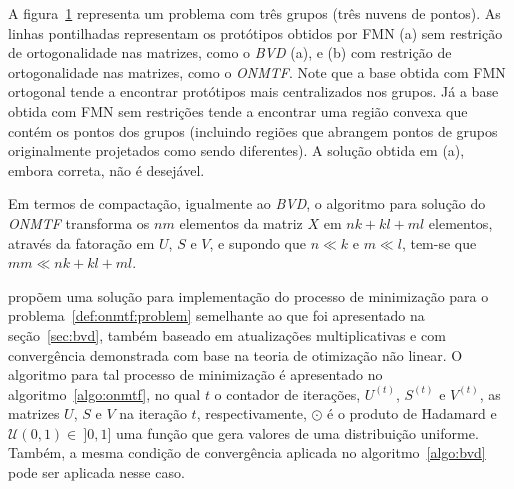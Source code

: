 \documentclass[
    12pt,                %
    oneside,            %
    a4paper,            %
    english,            %
    brazil                %
    ]{abntex2ppgsi}
\begin{document}
\begin{figure} [htpb]

\label{fig:bvdvsonmtf}
\end{figure}

A figura~\ref{fig:bvdvsonmtf} representa um problema com três grupos (três nuvens de pontos).
As linhas pontilhadas representam os protótipos obtidos por FMN (a) sem restrição de ortogonalidade nas matrizes, como o \textit{BVD} (a), e (b) com restrição de ortogonalidade nas matrizes, como o \textit{ONMTF}.
Note que a base obtida com FMN ortogonal tende a encontrar protótipos mais centralizados nos grupos.
Já a base obtida com FMN sem restrições tende a encontrar uma região convexa que contém os pontos dos grupos (incluindo regiões que abrangem pontos de grupos originalmente projetados como sendo diferentes).
A solução obtida em (a), embora correta, não é desejável.

Em termos de compactação, igualmente ao \textit{BVD}, o algoritmo para solução do \textit{ONMTF} transforma os $nm$ elementos da matriz $X$ em $nk + kl + ml$ elementos, através da fatoração em $U$, $S$ e $V$, e supondo que $n \ll k$ e $m \ll l$, tem-se que $mm \ll nk + kl + ml$.

 propõem uma solução para implementação do processo de minimização para o problema~\ref{def:onmtf:problem} semelhante ao que foi apresentado na seção~\ref{sec:bvd}, também baseado em atualizações multiplicativas e com convergência demonstrada com base na teoria de otimização não linear.
O algoritmo para tal processo de minimização é apresentado no algoritmo~\ref{algo:onmtf}, no qual $t$ o contador de iterações, $U^{(t)}$, $S^{(t)}$ e $V^{(t)}$, as matrizes $U$, $S$ e $V$ na iteração $t$, respectivamente, $\odot$ é o produto de Hadamard e $\mathcal{U}(0, 1) \in~]0, 1]$ uma função que gera valores de uma distribuição uniforme.
Também, a mesma condição de convergência aplicada no algoritmo~\ref{algo:bvd} pode ser aplicada nesse caso.
\end{document}
